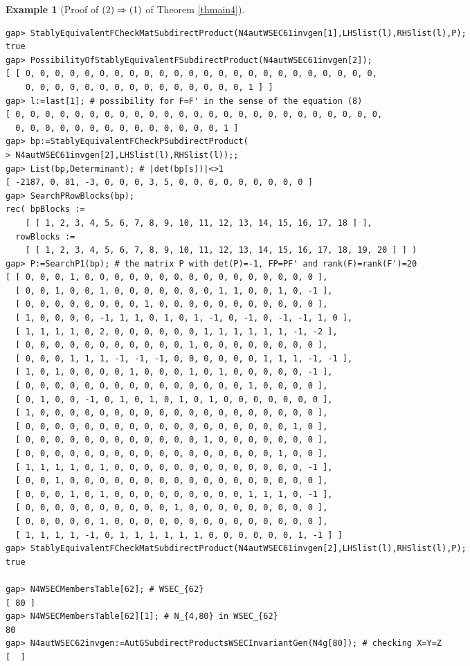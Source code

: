 \documentclass{amsart}
\theoremstyle{plain}
\theoremstyle{definition}
\newtheorem{example}[theorem]{Example}
\theoremstyle{remark}
\begin{document}
\begin{example}[Proof of ${\rm (2)}\Rightarrow {\rm (1)}$ of {Theorem \ref{thmain4}}]
\begin{verbatim}
gap> StablyEquivalentFCheckMatSubdirectProduct(N4autWSEC61invgen[1],LHSlist(l),RHSlist(l),P);
true
gap> PossibilityOfStablyEquivalentFSubdirectProduct(N4autWSEC61invgen[2]);
[ [ 0, 0, 0, 0, 0, 0, 0, 0, 0, 0, 0, 0, 0, 0, 0, 0, 0, 0, 0, 0, 0, 0, 0, 0, 
    0, 0, 0, 0, 0, 0, 0, 0, 0, 0, 0, 0, 0, 0, 0, 1 ] ]
gap> l:=last[1]; # possibility for F=F' in the sense of the equation (8)
[ 0, 0, 0, 0, 0, 0, 0, 0, 0, 0, 0, 0, 0, 0, 0, 0, 0, 0, 0, 0, 0, 0, 0, 0, 0, 
  0, 0, 0, 0, 0, 0, 0, 0, 0, 0, 0, 0, 0, 0, 1 ]
gap> bp:=StablyEquivalentFCheckPSubdirectProduct(
> N4autWSEC61invgen[2],LHSlist(l),RHSlist(l));;
gap> List(bp,Determinant); # |det(bp[s])|<>1
[ -2187, 0, 81, -3, 0, 0, 0, 3, 5, 0, 0, 0, 0, 0, 0, 0, 0, 0 ]
gap> SearchPRowBlocks(bp);
rec( bpBlocks := 
    [ [ 1, 2, 3, 4, 5, 6, 7, 8, 9, 10, 11, 12, 13, 14, 15, 16, 17, 18 ] ], 
  rowBlocks := 
    [ [ 1, 2, 3, 4, 5, 6, 7, 8, 9, 10, 11, 12, 13, 14, 15, 16, 17, 18, 19, 20 ] ] )
gap> P:=SearchP1(bp); # the matrix P with det(P)=-1, FP=PF' and rank(F)=rank(F')=20
[ [ 0, 0, 0, 1, 0, 0, 0, 0, 0, 0, 0, 0, 0, 0, 0, 0, 0, 0, 0, 0 ], 
  [ 0, 0, 1, 0, 0, 1, 0, 0, 0, 0, 0, 0, 0, 1, 1, 0, 0, 1, 0, -1 ], 
  [ 0, 0, 0, 0, 0, 0, 0, 0, 1, 0, 0, 0, 0, 0, 0, 0, 0, 0, 0, 0 ], 
  [ 1, 0, 0, 0, 0, -1, 1, 1, 0, 1, 0, 1, -1, 0, -1, 0, -1, -1, 1, 0 ], 
  [ 1, 1, 1, 1, 0, 2, 0, 0, 0, 0, 0, 0, 1, 1, 1, 1, 1, 1, -1, -2 ], 
  [ 0, 0, 0, 0, 0, 0, 0, 0, 0, 0, 0, 1, 0, 0, 0, 0, 0, 0, 0, 0 ], 
  [ 0, 0, 0, 1, 1, 1, -1, -1, -1, 0, 0, 0, 0, 0, 0, 1, 1, 1, -1, -1 ], 
  [ 1, 0, 1, 0, 0, 0, 0, 1, 0, 0, 0, 1, 0, 1, 0, 0, 0, 0, 0, -1 ], 
  [ 0, 0, 0, 0, 0, 0, 0, 0, 0, 0, 0, 0, 0, 0, 0, 1, 0, 0, 0, 0 ], 
  [ 0, 1, 0, 0, -1, 0, 1, 0, 1, 0, 1, 0, 1, 0, 0, 0, 0, 0, 0, 0 ], 
  [ 1, 0, 0, 0, 0, 0, 0, 0, 0, 0, 0, 0, 0, 0, 0, 0, 0, 0, 0, 0 ], 
  [ 0, 0, 0, 0, 0, 0, 0, 0, 0, 0, 0, 0, 0, 0, 0, 0, 0, 0, 1, 0 ], 
  [ 0, 0, 0, 0, 0, 0, 0, 0, 0, 0, 0, 0, 1, 0, 0, 0, 0, 0, 0, 0 ], 
  [ 0, 0, 0, 0, 0, 0, 0, 0, 0, 0, 0, 0, 0, 0, 0, 0, 0, 1, 0, 0 ], 
  [ 1, 1, 1, 1, 0, 1, 0, 0, 0, 0, 0, 0, 0, 0, 0, 0, 0, 0, 0, -1 ], 
  [ 0, 0, 1, 0, 0, 0, 0, 0, 0, 0, 0, 0, 0, 0, 0, 0, 0, 0, 0, 0 ], 
  [ 0, 0, 0, 1, 0, 1, 0, 0, 0, 0, 0, 0, 0, 0, 0, 1, 1, 1, 0, -1 ], 
  [ 0, 0, 0, 0, 0, 0, 0, 0, 0, 0, 1, 0, 0, 0, 0, 0, 0, 0, 0, 0 ], 
  [ 0, 0, 0, 0, 0, 1, 0, 0, 0, 0, 0, 0, 0, 0, 0, 0, 0, 0, 0, 0 ], 
  [ 1, 1, 1, 1, -1, 0, 1, 1, 1, 1, 1, 1, 0, 0, 0, 0, 0, 0, 1, -1 ] ]
gap> StablyEquivalentFCheckMatSubdirectProduct(N4autWSEC61invgen[2],LHSlist(l),RHSlist(l),P);
true

gap> N4WSECMembersTable[62]; # WSEC_{62}
[ 80 ]
gap> N4WSECMembersTable[62][1]; # N_{4,80} in WSEC_{62}
80
gap> N4autWSEC62invgen:=AutGSubdirectProductsWSECInvariantGen(N4g[80]); # checking X=Y=Z
[  ]


\end{verbatim}
\end{example}
\end{document}
